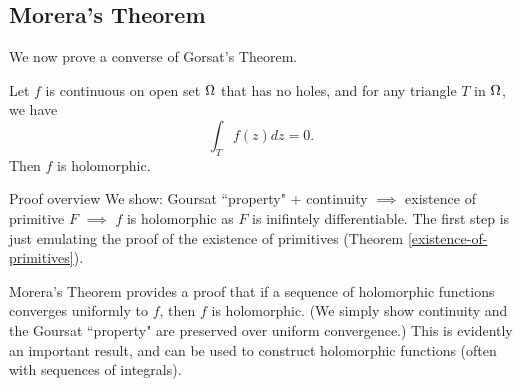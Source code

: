 \subsection{Morera's Theorem}
We now prove a converse of Gorsat's Theorem.
\begin{thm}
    Let $f$ is continuous on open set $\Omega$ that has no holes, and for any triangle $T$ in $\Omega$, we have
    \[
        \int_T f(z) dz = 0.
    \]
    Then $f$ is holomorphic.
\end{thm}
\begin{details}{Proof overview}
    We show: Goursat ``property" + continuity $\implies$ existence of primitive $F$ $\implies$ $f$ is holomorphic as $F$ is inifintely differentiable. The first step is just emulating the proof of the existence of primitives (Theorem \ref{existence-of-primitives}).
\end{details}
Morera's Theorem provides a proof that if a sequence of holomorphic functions converges uniformly to $f$, then $f$ is holomorphic. (We simply show continuity and the Goursat ``property" are preserved over uniform convergence.) This is evidently an important result, and can be used to construct holomorphic functions (often with sequences of integrals).
